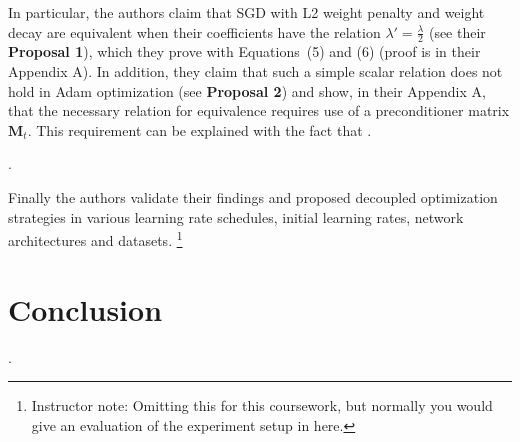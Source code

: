\documentclass{article}
\begin{document}
In particular, the authors claim that SGD with L2 weight penalty and weight decay are equivalent when their coefficients have the relation $\lambda'=\frac{\lambda}{2}$ (see their \textbf{Proposal 1}), which they prove with Equations~(5) and (6) (proof is in their Appendix A).
In addition, they claim that such a simple scalar relation does not hold in Adam optimization (see \textbf{Proposal 2}) and show, in their Appendix A, that the necessary relation for equivalence requires use of a preconditioner matrix $\bm{M}_t$.
This requirement can be explained with the fact that \questionSixteen.

\questionSeventeen.

Finally the authors validate their findings and proposed decoupled optimization strategies in various learning rate schedules, initial learning rates, network architectures and datasets. \footnote{Instructor note: Omitting this for this coursework, but normally you would give an evaluation of the experiment setup in \cite{loshchilov2019decoupled} here.}


\section{Conclusion}
\label{sec:concl}
    
\questionEighteen.

\newpage

\end{document}
